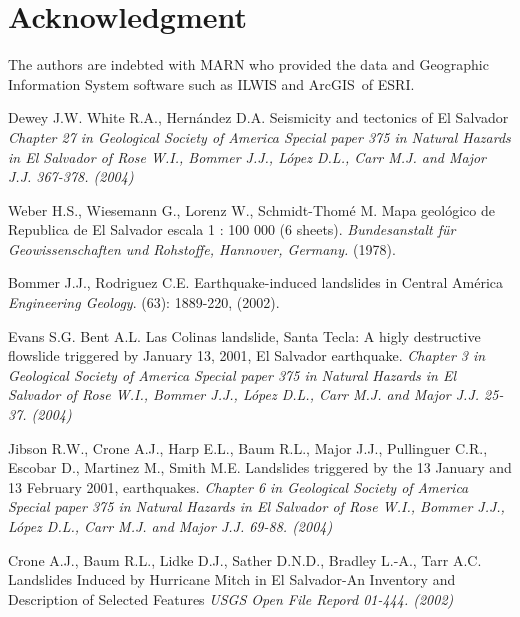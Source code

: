 \documentclass[11pt,twoside]{rmta2010esp}%
\begin{document}
\section{Acknowledgment}   
The authors are indebted with MARN who provided the data and Geographic Information System software such as ILWIS and ArcGIS\textregistered \  of ESRI.



\begin{thebibliography}{99}




Dewey J.W. White R.A., Hern\'{a}ndez D.A.
\newblock Seismicity and tectonics of El Salvador
\newblock \emph{Chapter 27 in Geological Society of America Special paper 375 in Natural Hazards in El Salvador of Rose W.I., Bommer J.J., L\'{o}pez D.L., Carr M.J. and Major J.J. 367-378. (2004)}


Weber H.S., Wiesemann G., Lorenz  W., Schmidt-Thom\'{e} M.
\newblock Mapa geol\'{o}gico de Republica de El Salvador
\newblock escala 1 : 100 000 (6 sheets).
\newblock \emph{ Bundesanstalt f\"ur Geowissenschaften und Rohstoffe, Hannover, Germany.
}
 (1978).


Bommer J.J., Rodriguez C.E.
\newblock Earthquake-induced landslides in Central Am\'{e}rica
\newblock \emph{Engineering Geology}.
(63): 1889-220, (2002).


Evans S.G. Bent A.L.
\newblock Las Colinas landslide, Santa Tecla:  A higly destructive flowslide triggered by January 13, 2001, El Salvador earthquake.
\newblock \emph{Chapter 3 in Geological Society of America Special paper 375 in Natural Hazards in El Salvador of Rose W.I., Bommer J.J., L\'{o}pez D.L., Carr M.J. and Major J.J. 25-37. (2004)}



Jibson R.W., Crone A.J., Harp E.L., Baum R.L., Major J.J., Pullinguer C.R., Escobar D., Martinez M., Smith M.E. 
\newblock Landslides triggered by the 13 January and 13 February 2001, earthquakes.
\newblock \emph{ Chapter 6 in Geological Society of America Special paper 375 in Natural Hazards in El Salvador of Rose W.I., Bommer J.J., L\'{o}pez D.L., Carr M.J. and Major J.J. 69-88. (2004)}



Crone A.J., Baum R.L., Lidke D.J., Sather D.N.D., Bradley L.-A., Tarr A.C.
\newblock Landslides Induced by Hurricane Mitch in El Salvador-An Inventory and Description of Selected Features
\newblock \emph{USGS Open File Repord 01-444. (2002)}



\end{thebibliography}
\end{document}
